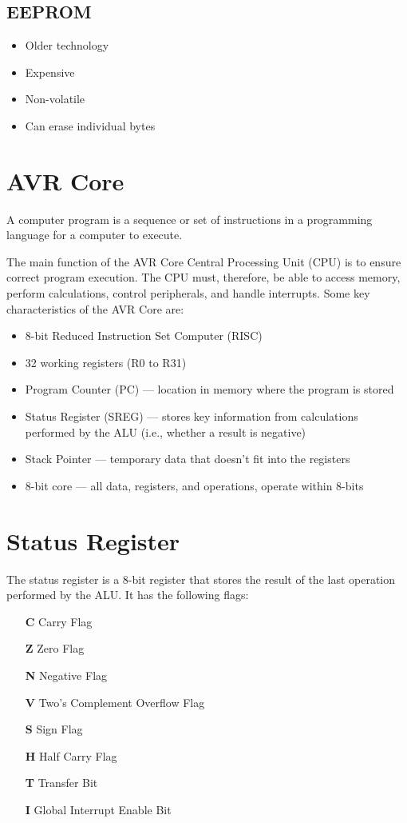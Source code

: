 \documentclass[a4paper]{report}
\begin{document}
\subsection{EEPROM}
\begin{itemize}
    \item Older technology
    \item Expensive
    \item Non-volatile
    \item Can erase individual bytes
\end{itemize}
\section{AVR Core}
\begin{definition}
    A computer program is a sequence or set of instructions in a programming language
    for a computer to execute.
\end{definition}
The main function of the AVR Core Central Processing Unit (CPU) is to ensure correct program execution.
The CPU must, therefore, be able to access memory, perform calculations, control peripherals, and handle interrupts.
Some key characteristics of the AVR Core are:
\begin{itemize}
    \item 8-bit Reduced Instruction Set Computer (RISC)
    \item 32 working registers (R0 to R31)
    \item Program Counter (PC) --- location in memory where the program is stored
    \item Status Register (SREG) --- stores key information from calculations performed by the ALU (i.e., whether a result is negative)
    \item Stack Pointer --- temporary data that doesn't fit into the registers
    \item 8-bit core --- all data, registers, and operations, operate within 8-bits
\end{itemize}
\section{Status Register}
The status register is a 8-bit register that stores the result of the last operation performed by the ALU\@.
It has the following flags:
\begin{itemize}
    \item[\textbf{C}] Carry Flag
    \item[\textbf{Z}] Zero Flag
    \item[\textbf{N}] Negative Flag
    \item[\textbf{V}] Two's Complement Overflow Flag
    \item[\textbf{S}] Sign Flag
    \item[\textbf{H}] Half Carry Flag
    \item[\textbf{T}] Transfer Bit
    \item[\textbf{I}] Global Interrupt Enable Bit
\end{itemize}
\end{document}
